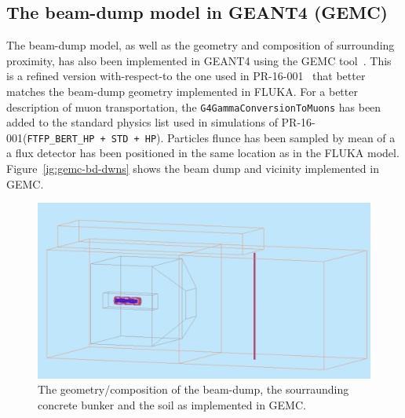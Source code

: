 \subsection{The beam-dump model in GEANT4 (GEMC)}
The beam-dump model, as well as the geometry and composition  of surrounding proximity,
 has also been implemented in GEANT4 using the GEMC tool~\cite{gemc}. This is a refined version with-respect-to the one used  in PR-16-001~\cite{bdx-proposal} that better matches the beam-dump geometry implemented in FLUKA. For a better description of  muon transportation, the {\tt G4GammaConversionToMuons} has been added to the standard physics list used in simulations of  PR-16-001({\tt FTFP\_BERT\_HP + STD + HP}).
Particles flunce has been sampled  by mean of a  a flux detector has been positioned in the same location as in the FLUKA model.
Figure~\ref{ig:gemc-bd-dwns} shows the beam dump and vicinity implemented in GEMC.
\begin{figure}[h!] 
\center
\includegraphics[width=12.5cm]{figs/gemc-bd-dwns.pdf}  
\caption{The geometry/composition  of the beam-dump, the sourraunding concrete bunker and  the soil as implemented in GEMC.}
\label{fig:gemc-bd-dwns}
\end{figure}
